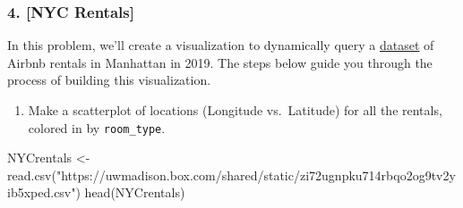 \documentclass[
]{article}
\newenvironment{Shaded}{\begin{snugshade}}{\end{snugshade}}
\newcommand{\FunctionTok}[1]{\textcolor[rgb]{0.00,0.00,0.00}{#1}}
\newcommand{\NormalTok}[1]{#1}
\newcommand{\OtherTok}[1]{\textcolor[rgb]{0.56,0.35,0.01}{#1}}
\newcommand{\StringTok}[1]{\textcolor[rgb]{0.31,0.60,0.02}{#1}}
\providecommand{\tightlist}{%
  \setlength{\itemsep}{0pt}\setlength{\parskip}{0pt}}
\begin{document}
\hypertarget{nyc-rentals}{%
\subsubsection{4. {[}NYC Rentals{]}}\label{nyc-rentals}}

In this problem, we'll create a visualization to dynamically query a
\href{https://uwmadison.box.com/shared/static/zi72ugnpku714rbqo2og9tv2yib5xped.csv}{dataset}
of Airbnb rentals in Manhattan in 2019. The steps below guide you
through the process of building this visualization.

\begin{enumerate}
\def\labelenumi{\alph{enumi}.}
\tightlist
\item
  Make a scatterplot of locations (Longitude vs.~Latitude) for all the
  rentals, colored in by \texttt{room\_type}.
\end{enumerate}

\begin{Shaded}
\begin{Highlighting}[]
\NormalTok{NYCrentals }\OtherTok{\textless{}{-}} \FunctionTok{read.csv}\NormalTok{(}\StringTok{"https://uwmadison.box.com/shared/static/zi72ugnpku714rbqo2og9tv2yib5xped.csv"}\NormalTok{)}
\FunctionTok{head}\NormalTok{(NYCrentals)}
\end{Highlighting}
\end{Shaded}
\end{document}
